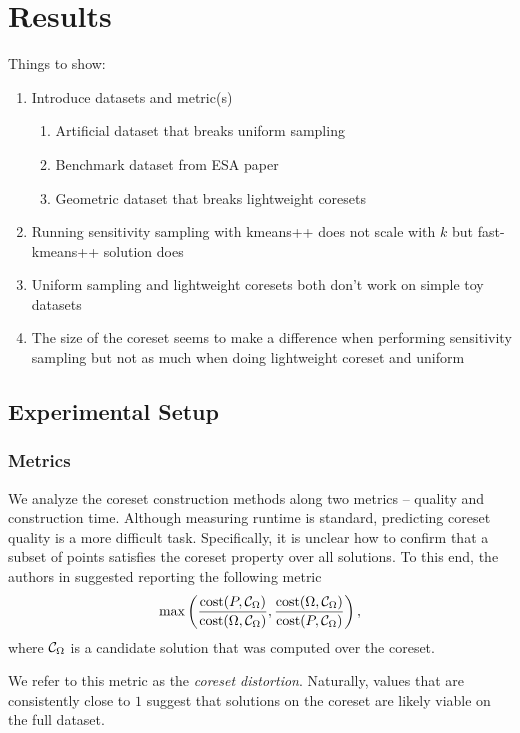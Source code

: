\section{Results}
Things to show:
\begin{enumerate}
    \item Introduce datasets and metric(s)
    \begin{enumerate}
        \item Artificial dataset that breaks uniform sampling
        \item Benchmark dataset from ESA paper
        \item Geometric dataset that breaks lightweight coresets
    \end{enumerate}
    \item Running sensitivity sampling with kmeans++ does not scale with $k$ but fast-kmeans++ solution does
    \item Uniform sampling and lightweight coresets both don't work on simple toy datasets
    \item The size of the coreset seems to make a difference when performing sensitivity sampling but not as much
          when doing lightweight coreset and uniform
\end{enumerate}

\subsection{Experimental Setup}
\subsubsection{Metrics}

We analyze the coreset construction methods along two metrics -- quality and construction time.  Although measuring runtime is standard, predicting coreset
quality is a more difficult task. Specifically, it is unclear how to confirm that a subset of points satisfies the coreset property over all solutions. To this
end, the authors in \cite{chrisESA} suggested reporting the following metric 
\[ \max \left( \dfrac{\operatorname{cost}(P, \mathcal C_{\Omega})}{\operatorname{cost}(\Omega, \mathcal C_{\Omega})}, \dfrac{\operatorname{cost}(\Omega, \mathcal C_{\Omega})}{\operatorname{cost}(P, \mathcal C_{\Omega})} \right),\]
where $\mathcal C_{\Omega}$ is a candidate solution that was computed over the coreset.

We refer to this metric as the \emph{coreset distortion}. Naturally, values that are consistently close to $1$ suggest that solutions on the coreset are likely
viable on the full dataset.

